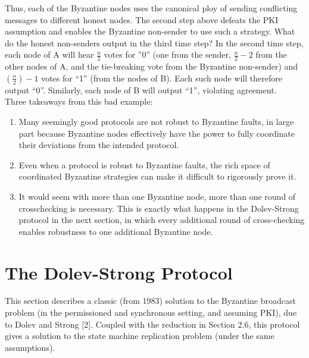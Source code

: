 Thus, each of the Byzantine nodes uses the canonical ploy of sending conflicting messages to
different honest nodes. The second step above defeats the PKI assumption and enables the
Byzantine non-sender to use such a strategy.
What do the honest non-senders output in the third time step? In the second time step,
each node of A will hear $\frac{n}{2}$ votes for ”0” (one from the sender, $\frac{n}{2} - 2$ from the other
nodes of A, and the tie-breaking vote from the Byzantine non-sender) and $(\frac{n}{2}) - 1$ votes
for “1” (from the nodes of B). Each such node will therefore output “0”. Similarly, each
node of B will output “1”, violating agreement.\\
Three takeaways from this bad example:
\begin{enumerate}
    \item Many seemingly good protocols are not robust to Byzantine faults, in large part because
Byzantine nodes effectively have the power to fully coordinate their deviations from
the intended protocol.
    \item Even when a protocol is robust to Byzantine faults, the rich space of coordinated
Byzantine strategies can make it difficult to rigorously prove it.
    \item It would seem with more than one Byzantine node, more than one round of crosschecking is necessary. This is exactly what happens in the Dolev-Strong protocol in
the next section, in which every additional round of cross-checking enables robustness
to one additional Byzantine node.
\end{enumerate}


\section{The Dolev-Strong Protocol}
This section describes a classic (from 1983) solution to the Byzantine broadcast problem (in
the permissioned and synchronous setting, and assuming PKI), due to Dolev and Strong [2]. 
Coupled with the reduction in Section 2.6, this protocol gives a solution to the state machine
replication problem (under the same assumptions).\\
